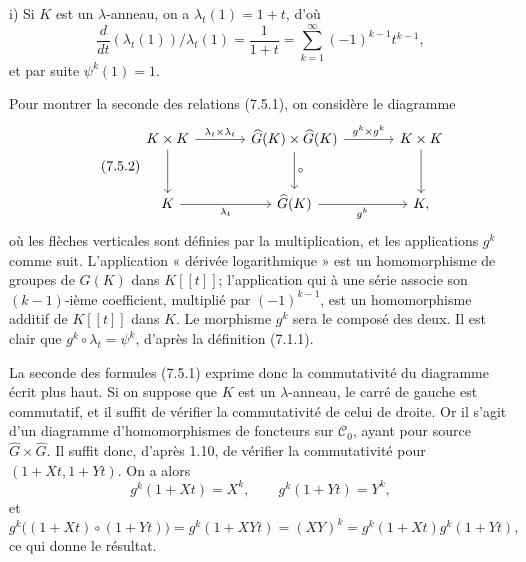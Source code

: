 \documentclass[11pt]{article}
\begin{document}
i) Si \(K\) est un \(\lambda\)-anneau, on a \(\lambda_t(1)=1+t\), d'où
\[
  \frac{d}{dt}(\lambda_t(1))/\lambda_t(1)
  =
  \frac1{1+t}
  =
  \sum_{k=1}^{\infty}(-1)^{k-1}t^{k-1},
\]
et par suite \(\psi^k(1)=1\).

Pour montrer la seconde des relations (7.5.1), on considère le diagramme
\begin{equation}\tag{7.5.2}
\begin{tikzcd}[column sep=large,row sep=large]
K\times K \arrow[r,"\lambda_t\times\lambda_t"] \arrow[d] &
\widehat G(K)\times\widehat G(K) \arrow[r,"g^k\times g^k"] \arrow[d,"\circ"] &
K\times K \arrow[d]\\
K \arrow[r,"\lambda_t"'] &
\widehat G(K) \arrow[r,"g^k"'] &
K ,
\end{tikzcd}
\end{equation}
où les flèches verticales sont définies par la multiplication, et les applications \(g^k\) comme suit. L'application « dérivée logarithmique » est un homomorphisme de groupes de \(G(K)\) dans \(K[[t]]\); l'application qui à une série associe son \((k-1)\)-ième coefficient, multiplié par \((-1)^{k-1}\), est un homomorphisme additif de \(K[[t]]\) dans \(K\). Le morphisme \(g^k\) sera le composé des deux. Il est clair que \(g^k\circ\lambda_t=\psi^k\), d'après la définition (7.1.1).

La seconde des formules (7.5.1) exprime donc la commutativité du diagramme écrit plus haut. Si on suppose que \(K\) est un \(\lambda\)-anneau, le carré de gauche est commutatif, et il suffit de vérifier la commutativité de celui de droite. Or il s'agit d'un diagramme d'homomorphismes de foncteurs sur \(\mathscr C_0\), ayant pour source \(\widehat G\times\widehat G\). Il suffit donc, d'après 1.10, de vérifier la commutativité pour \((1+Xt,1+Yt)\). On a alors
\[
  g^k(1+Xt)=X^k,\qquad g^k(1+Yt)=Y^k,
\]
et
\[
  g^k\bigl((1+Xt)\circ(1+Yt)\bigr)
  =
  g^k(1+XYt)
  =
  (XY)^k
  =
  g^k(1+Xt)g^k(1+Yt),
\]
ce qui donne le résultat.
\end{document}
